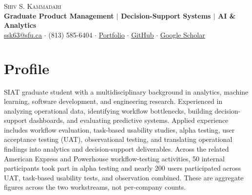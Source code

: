 \documentclass[10pt,a4paper]{article}
\begin{document}
\begin{center}{\LARGE\scshape Shiv S. Kammadari}\\[3pt]
{\large\bfseries Graduate Product Management $|$ Decision-Support Systems $|$ AI \& Analytics}\\[4pt]
\href{mailto:ssk63@sfu.ca}{ssk63@sfu.ca} $\cdot$ (813) 585-6404 $\cdot$ \href{https://shivkammadari23.github.io/}{Portfolio} $\cdot$ \href{https://github.com/shivkammadari23}{GitHub} $\cdot$ \href{https://scholar.google.com/citations?hl=en\&user=CRAJqL0AAAAJ}{Google Scholar}\end{center}\vspace{-6pt}
\section{Profile}
SIAT graduate student with a multidisciplinary background in analytics, machine learning, software development, and engineering research. Experienced in analyzing operational data, identifying workflow bottlenecks, building decision-support dashboards, and evaluating predictive systems. Applied experience includes workflow evaluation, task-based usability studies, alpha testing, user acceptance testing (UAT), observational testing, and translating operational findings into analytics and decision-support deliverables. Across the related American Express and Powerhouse workflow-testing activities, 50 internal participants took part in alpha testing and nearly 200 users participated across UAT, task-based usability tests, and observation combined. These are aggregate figures across the two workstreams, not per-company counts.
\end{document}
